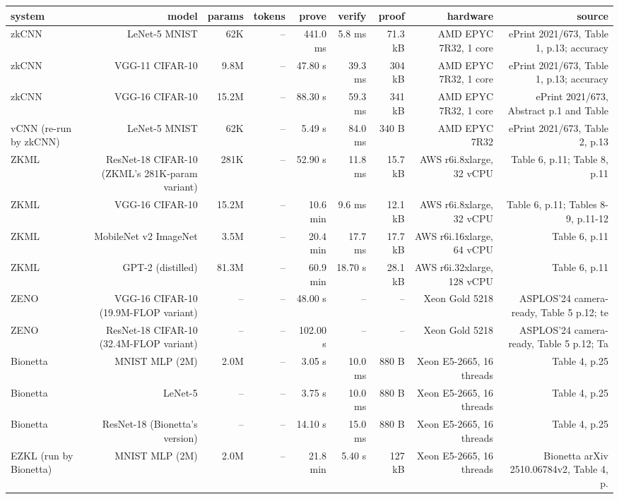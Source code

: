 \begin{tabular}{lrrrrrrrr}
\toprule
system & model & params & tokens & prove & verify & proof & hardware & source \\
\midrule
zkCNN & LeNet-5 MNIST & 62K & – & 441.0 ms & 5.8 ms & 71.3 kB & AMD EPYC 7R32, 1 core & ePrint 2021/673, Table 1, p.13; accuracy \\
zkCNN & VGG-11 CIFAR-10 & 9.8M & – & 47.80 s & 39.3 ms & 304 kB & AMD EPYC 7R32, 1 core & ePrint 2021/673, Table 1, p.13; accuracy \\
zkCNN & VGG-16 CIFAR-10 & 15.2M & – & 88.30 s & 59.3 ms & 341 kB & AMD EPYC 7R32, 1 core & ePrint 2021/673, Abstract p.1 and Table  \\
vCNN (re-run by zkCNN) & LeNet-5 MNIST & 62K & – & 5.49 s & 84.0 ms & 340 B & AMD EPYC 7R32 & ePrint 2021/673, Table 2, p.13 \\
ZKML & ResNet-18 CIFAR-10 (ZKML's 281K-param variant) & 281K & – & 52.90 s & 11.8 ms & 15.7 kB & AWS r6i.8xlarge, 32 vCPU & Table 6, p.11; Table 8, p.11 \\
ZKML & VGG-16 CIFAR-10 & 15.2M & – & 10.6 min & 9.6 ms & 12.1 kB & AWS r6i.8xlarge, 32 vCPU & Table 6, p.11; Tables 8-9, p.11-12 \\
ZKML & MobileNet v2 ImageNet & 3.5M & – & 20.4 min & 17.7 ms & 17.7 kB & AWS r6i.16xlarge, 64 vCPU & Table 6, p.11 \\
ZKML & GPT-2 (distilled) & 81.3M & – & 60.9 min & 18.70 s & 28.1 kB & AWS r6i.32xlarge, 128 vCPU & Table 6, p.11 \\
ZENO & VGG-16 CIFAR-10 (19.9M-FLOP variant) & – & – & 48.00 s & – & – & Xeon Gold 5218 & ASPLOS'24 camera-ready, Table 5 p.12; te \\
ZENO & ResNet-18 CIFAR-10 (32.4M-FLOP variant) & – & – & 102.00 s & – & – & Xeon Gold 5218 & ASPLOS'24 camera-ready, Table 5 p.12; Ta \\
Bionetta & MNIST MLP (2M) & 2.0M & – & 3.05 s & 10.0 ms & 880 B & Xeon E5-2665, 16 threads & Table 4, p.25 \\
Bionetta & LeNet-5 & – & – & 3.75 s & 10.0 ms & 880 B & Xeon E5-2665, 16 threads & Table 4, p.25 \\
Bionetta & ResNet-18 (Bionetta's version) & – & – & 14.10 s & 15.0 ms & 880 B & Xeon E5-2665, 16 threads & Table 4, p.25 \\
EZKL (run by Bionetta) & MNIST MLP (2M) & 2.0M & – & 21.8 min & 5.40 s & 127 kB & Xeon E5-2665, 16 threads & Bionetta arXiv 2510.06784v2, Table 4, p. \\

\end{tabular}
